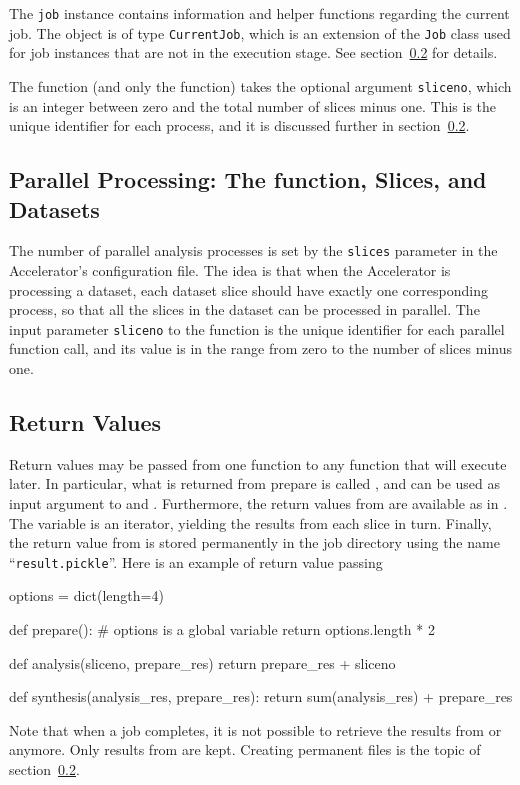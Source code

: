 The \texttt{job} instance contains information and helper functions
regarding the current job.  The object is of type \texttt{CurrentJob},
which is an extension of the \texttt{Job} class used for job instances
that are not in the execution stage.  See section~\ref{} for details.

The \analysis function (and only the \analysis function) takes the
optional argument \texttt{sliceno}, which is an integer between zero
and the total number of slices minus one.  This is the unique
identifier for each \analysis process, and it is discussed further in
section~\ref{}.


\subsection{Parallel Processing:  The \analysis function, Slices, and Datasets}
The number of parallel analysis processes is set by the
\texttt{slices} parameter in the Accelerator's configuration file.
The idea is that when the Accelerator is processing a dataset, each
dataset slice should have exactly one corresponding \analysis process,
so that all the slices in the dataset can be processed in parallel.
The input parameter \texttt{sliceno} to the \analysis function is the
unique identifier for each parallel function call, and its value is in
the range from zero to the number of slices minus one.


\subsection{Return Values}
Return values may be passed from one function to any function that
will execute later.  In particular, what is returned from prepare is
called \prepareres, and can be used as input argument to \analysis and
\synthesis.  Furthermore, the return values from \analysis are
available as \analysisres in \synthesis.  The \analysisres variable is
an iterator, yielding the results from each slice in turn.  Finally,
the return value from \synthesis is stored permanently in the job
directory using the name ``\texttt{result.pickle}''.  Here is an
example of return value passing
\begin{python}
options = dict(length=4)

def prepare():
    # options is a global variable
    return options.length * 2

def analysis(sliceno, prepare_res)
    return prepare_res + sliceno

def synthesis(analysis_res, prepare_res):
     return sum(analysis_res) + prepare_res
\end{python}
Note that when a job completes, it is not possible to retrieve the
results from \prepare or \analysis anymore.  Only results from
\synthesis are kept.  Creating permanent files is the topic of
section~\ref{}.


